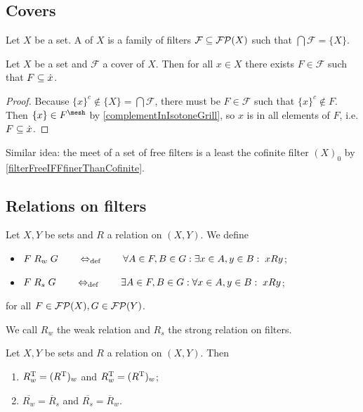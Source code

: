 \subsection{Covers}
\begin{definition}
Let $X$ be a set. A  of $X$ is a family of filters $\mathcal{F}\subseteq \operatorname{\mathcal{FP}}(X)$ such that $\bigcap \mathcal{F} = \{X\}$.
\end{definition}

\begin{lemma} \label{principalUltrafilterInCover}
Let $X$ be a set and $\mathcal{F}$ a cover of $X$. Then for all $x\in X$ there exists $F\in \mathcal{F}$ such that $F\subseteq \dot{x}$.
\end{lemma}
\begin{proof}
Because $\{x\}^c \notin \{X\} = \bigcap \mathcal{F}$, there must be $F\in \mathcal{F}$ such that $\{x\}^c \notin F$. Then $\{x\} \in F^\mesh$ by \ref{complementInIsotoneGrill}, so $x$ is in all elements of $F$, i.e. $F\subseteq \dot{x}$.
\end{proof}
Similar idea: the meet of a set of free filters is a least the cofinite filter $(X)_0$ by \ref{filterFreeIFFfinerThanCofinite}.

\subsection{Relations on filters}
\begin{definition}
Let $X,Y$ be sets and $R$ a relation on $(X,Y)$. We define
\begin{itemize}
\item $F \mathrel{R_w} G \quad \quad\Leftrightarrow_{\text{def}}\quad\quad \forall A\in F, B\in G: \exists x\in A, y\in B: \; xRy$;
\item $F \mathrel{R_s} G \quad \quad\Leftrightarrow_{\text{def}}\quad\quad \exists A\in F, B\in G: \forall x\in A, y\in B: \; xRy$;
\end{itemize}
for all $F\in \operatorname{\mathcal{FP}}(X), G\in \operatorname{\mathcal{FP}}(Y)$.

We call $R_w$ the weak relation and $R_s$ the strong relation on filters.
\end{definition}

\begin{lemma} \label{filterRelationsLemma}
Let $X,Y$ be sets and $R$ a relation on $(X,Y)$. Then
\begin{enumerate}
\item $R_w^{\mathrm{T}} = (R^{\mathrm{T}})_w$ and $R_w^{\mathrm{T}} = (R^{\mathrm{T}})_w$;
\item $\overline{R_w} = \overline{R}_s$ and $\overline{R_s} = \overline{R}_w$.
\end{enumerate}
\end{lemma}

